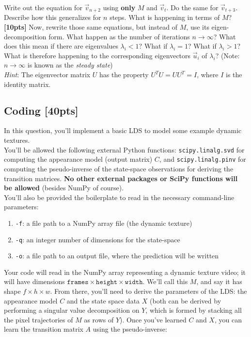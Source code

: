 \documentclass[paper=a4, fontsize=11pt]{scrartcl} %
\numberwithin{figure}{section} %
\numberwithin{table}{section} %
\begin{document}
Write out the equation for $\vec{v}_{n + 2}$ using \textbf{only} $M$ and $\vec{v}_t$. Do the same for $\vec{v}_{t + 3}$. Describe how this generalizes for $n$ steps. What is happening in terms of $M$? \\

\textbf{[10pts]} Now, rewrite those same equations, but instead of $M$, use its eigen-decomposition form. What happen as the number of iterations $n \rightarrow \infty$? What does this mean if there are eigenvalues $\lambda_i < 1$? What if $\lambda_i = 1$? What if $\lambda_i > 1$? What is therefore happening to the corresponding eigenvectors $\vec{u}_i$ of $\lambda_i$? (Note: $n \rightarrow \infty$ is known as the \emph{steady state}) \\ 

\emph{Hint}: The eigenvector matrix $U$ has the property $U^TU = UU^T = I$, where $I$ is the identity matrix.

\subsection{Coding \textbf{[40pts]}}

In this question, you'll implement a basic LDS to model some example dynamic textures. \\

You'll be allowed the following external Python functions: \texttt{scipy.linalg.svd} for computing the appearance model (output matrix) $C$, and \texttt{scipy.linalg.pinv} for computing the pseudo-inverse of the state-space observations for deriving the transition matrices. \textbf{No other external packages or SciPy functions will be allowed} (besides NumPy of course). \\

You'll also be provided the boilerplate to read in the necessary command-line parameters:

\begin{enumerate}
	\item \texttt{-f}: a file path to a NumPy array file (the dynamic texture)
	\item \texttt{-q}: an integer number of dimensions for the state-space
	\item \texttt{-o}: a file path to an output file, where the prediction will be written
\end{enumerate}

Your code will read in the NumPy array representing a dynamic texture video; it will have dimensions $\texttt{frames} \times \texttt{height} \times \texttt{width}$. We'll call this $M$, and say it has shape $f \times h \times w$. From there, you'll need to derive the parameters of the LDS: the appearance model $C$ and the state space data $X$ (both can be derived by performing a singular value decomposition on $Y$, which is formed by stacking all the pixel trajectories of $M$ as rows of $Y$). Once you've learned $C$ and $X$, you can learn the transition matrix $A$ using the pseudo-inverse:
\end{document}
